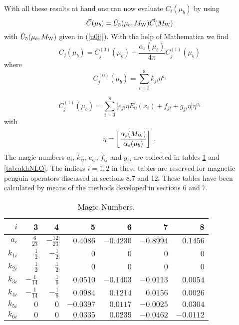 \documentclass[12pt]{article}
\def\as{\alpha_s}
\newcommand{\mw}{M_{\rm W}}
\newcommand{\be}{\begin{equation}}
\newcommand{\ee}{\end{equation}}
\begin{document}
\begin{itemize}
\begin{itemize}
With all these results at hand one can now evaluate $C_i(\mu_b)$
by using
\be\label{EVOLC}
\vec C(\mu_b)=\hat U_5(\mu_b,\mw) \vec C(\mw)
\ee
with $\hat U_5(\mu_b,\mw)$ given in (\ref{u0jj}). With the help
of Mathematica we find
\be
C_j(\mu_b)=C_j^{(0)}(\mu_b)+\frac{\as(\mu_b)}{4\pi}C_j^{(1)}(\mu_b)
\ee
where
\be
C_j^{(0)}(\mu_b)=\sum_{i=3}^8 k_{ji}\eta^{a_i}
\ee

\be
C_j^{(1)}(\mu_b)=\sum_{i=3}^8 \lbrack e_{ji}\eta E_0(x_t)+
f_{ji}+g_{ji}\eta\rbrack \eta^{a_i}
\ee
with
\be
\eta=\left[\frac{\as(\mw)}{\as(\mu_b)}\right]~.
\ee
The magic numbers $a_i$,
$k_{ij}$, $e_{ij}$, $f_{ij}$ and $g_{ij}$ are  collected in tables
\ref{tab:akhLO} and \ref{tab:akhNLO}. The indices $i=1,2$ in these
tables are reserved for magnetic penguin operators discussed in
sections 8.7 and 12. These tables have been calculated by means
of the methods developed in sections 6 and 7.

\begin{table}[htb]
\caption[]{Magic Numbers.
\label{tab:akhLO}}
\begin{center}
\begin{tabular}{|r|r|r|r|r|r|r|}
\hline
$i$ & 3 & 4 & 5 & 6 & 7 & 8 \\
\hline
$a_i $& $ \frac{6}{23} $&$
-\frac{12}{23} $&$
0.4086 $&$ -0.4230 $&$ -0.8994 $&$ 0.1456 $\\
$k_{1i} $&$ \frac{1}{2} $&$ - \frac{1}{2} $&$
0 $&$ 0 $&$ 0 $&$ 0 $\\
$k_{2i} $& $ \frac{1}{2} $&$  \frac{1}{2} $&$
0 $&$ 0 $&$ 0 $&$ 0 $\\
$k_{3i} $& $ - \frac{1}{14} $&$  \frac{1}{6} $&$
0.0510 $&$ - 0.1403 $&$ - 0.0113 $&$ 0.0054 $\\
$k_{4i} $& $ - \frac{1}{14} $&$  - \frac{1}{6} $&$
0.0984 $&$ 0.1214 $&$ 0.0156 $&$ 0.0026 $\\
$k_{5i} $& $ 0 $&$  0 $&$
- 0.0397 $&$ 0.0117 $&$ - 0.0025 $&$ 0.0304 $\\
$k_{6i} $&$ 0 $&$  0 $&$
0.0335 $&$ 0.0239 $&$ - 0.0462 $&$ -0.0112 $\\
\hline
\end{tabular}
\end{center}
\end{table}



\end{itemize}
\end{itemize}
\end{document}
